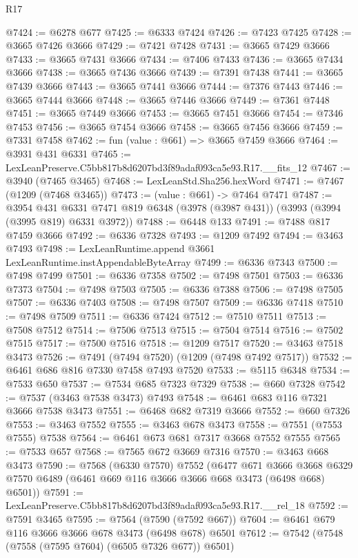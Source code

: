 \begin{lexlean}{R17}
\begin{coremodule}
@7424 := @6278 @677
@7425 := @6333 @7424
@7426 := @7423 @7425
@7428 := @3665 @7426 @3666
@7429 := @7421 @7428
@7431 := @3665 @7429 @3666
@7433 := @3665 @7431 @3666
@7434 := @7406 @7433
@7436 := @3665 @7434 @3666
@7438 := @3665 @7436 @3666
@7439 := @7391 @7438
@7441 := @3665 @7439 @3666
@7443 := @3665 @7441 @3666
@7444 := @7376 @7443
@7446 := @3665 @7444 @3666
@7448 := @3665 @7446 @3666
@7449 := @7361 @7448
@7451 := @3665 @7449 @3666
@7453 := @3665 @7451 @3666
@7454 := @7346 @7453
@7456 := @3665 @7454 @3666
@7458 := @3665 @7456 @3666
@7459 := @7331 @7458
@7462 := fun (value : @661) => @3665 @7459 @3666
@7464 := @3931 @431 @6331
@7465 := LexLeanPreserve.C5bb817b8d6207bd3f89adaf093ca5e93.R17.__fits_12
@7467 := @3940 (@7465 @3465)
@7468 := LexLeanStd.Sha256.hexWord
@7471 := @7467 (@1209 (@7468 @3465))
@7473 := (value : @661) -> @7464 @7471
@7487 := @3954
    @431
    @6331
    @7471
    @819
    @6348
    (@3978 (@3987 @431))
    (@3993 (@3994 (@3995 @819) @6331 @3972))
@7488 := @6448 @133
@7491 := @7488 @817 @7459 @3666
@7492 := @6336 @7328
@7493 := @1209 @7492
@7494 := @3463 @7493
@7498 := LexLeanRuntime.append @3661 LexLeanRuntime.instAppendableByteArray
@7499 := @6336 @7343
@7500 := @7498 @7499
@7501 := @6336 @7358
@7502 := @7498 @7501
@7503 := @6336 @7373
@7504 := @7498 @7503
@7505 := @6336 @7388
@7506 := @7498 @7505
@7507 := @6336 @7403
@7508 := @7498 @7507
@7509 := @6336 @7418
@7510 := @7498 @7509
@7511 := @6336 @7424
@7512 := @7510 @7511
@7513 := @7508 @7512
@7514 := @7506 @7513
@7515 := @7504 @7514
@7516 := @7502 @7515
@7517 := @7500 @7516
@7518 := @1209 @7517
@7520 := @3463 @7518 @3473
@7526 := @7491 (@7494 @7520) (@1209 (@7498 @7492 @7517))
@7532 := @6461 @686 @816 @7330 @7458 @7493 @7520
@7533 := @5115 @6348
@7534 := @7533 @650
@7537 := @7534 @685 @7323 @7329
@7538 := @660 @7328
@7542 := @7537 (@3463 @7538 @3473) @7493
@7548 := @6461 @683 @116 @7321 @3666 @7538 @3473
@7551 := @6468 @682 @7319 @3666
@7552 := @660 @7326
@7553 := @3463 @7552
@7555 := @3463 @678 @3473
@7558 := @7551 (@7553 @7555) @7538
@7564 := @6461 @673 @681 @7317 @3668 @7552 @7555
@7565 := @7533 @657
@7568 := @7565 @672 @3669 @7316
@7570 := @3463 @668 @3473
@7590 := @7568
    (@6330 @7570)
    @7552
    (@6477
      @671
      @3666
      @3668
      @6329
      @7570
      @6489
      (@6461 @669 @116 @3666 @3666 @668 @3473 (@6498 @668) @6501))
@7591 := LexLeanPreserve.C5bb817b8d6207bd3f89adaf093ca5e93.R17.__rel_18
@7592 := @7591 @3465
@7595 := @7564 (@7590 (@7592 @667))
@7604 := @6461 @679 @116 @3666 @3666 @678 @3473 (@6498 @678) @6501
@7612 := @7542 (@7548 (@7558 (@7595 @7604) (@6505 @7326 @677)) @6501)

\end{coremodule}
\end{lexlean}
